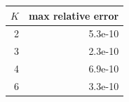 \begin{tabular}{rr}
\toprule
$K$ & max relative error \\
\midrule
2 & 5.3e-10 \\
3 & 2.3e-10 \\
4 & 6.9e-10 \\
6 & 3.3e-10 \\
\bottomrule
\end{tabular}